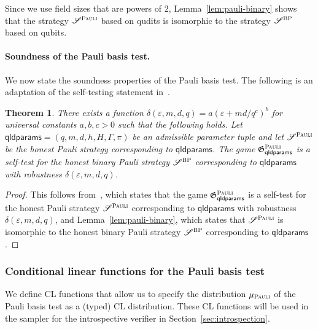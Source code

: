 \documentclass[11pt]{article}
\newtheorem{theorem}{Theorem}[section]
\theoremstyle{definition}
\newcommand{\eps}{\varepsilon}
\newcommand{\game}{\mathfrak{G}}
\newcommand{\strategy}{\mathscr{S}}
\newcommand{\gamestyle}[1]{\ensuremath{\textsc{#1}}\xspace}
\newcommand{\pauli}{\gamestyle{Pauli}}
\newcommand{\bp}{\gamestyle{BP}}
\newcommand{\qldparams}{\mathsf{qldparams}}
\begin{document}
Since we use field sizes that are powers of $2$, Lemma~\ref{lem:pauli-binary}
shows that the strategy $\strategy^\pauli$ based on qudits is isomorphic
to the strategy $\strategy^\bp$ based on qubits.


\paragraph{Soundness of the Pauli basis test.} 
We now state the soundness properties of the Pauli basis test.
The following is an adaptation of the self-testing statement in~\cite[Theorem
6.4]{NW19}.

\begin{theorem}
  \label{thm:pauli}
	There exists a function $\delta(\eps,m,d,q) = a (\eps + md/q^c)^{b}$ for
  universal constants $a,b,c > 0$ such that the following holds.
  Let $\qldparams = (q,m,d,h,H,\Gamma,\pi)$ be an admissible parameter tuple and
  let $\strategy^\pauli$ be the honest Pauli strategy corresponding to
  $\qldparams$.
  The game $\game^\pauli_\qldparams$ is a self-test for the honest binary Pauli
  strategy $\strategy^\bp$ corresponding to $\qldparams$ with robustness
  $\delta(\eps,m,d,q)$.
\end{theorem}

\begin{proof}
	This follows from~\cite[Theorem 6.4]{NW19}, which states that the game
  $\game^\pauli_\qldparams$ is a self-test for the honest Pauli strategy
  $\strategy^\pauli$ corresponding to $\qldparams$ with robustness
  $\delta(\eps,m,d,q)$, and Lemma~\ref{lem:pauli-binary}, which states that
  $\strategy^\pauli$ is isomorphic to the honest {binary} Pauli strategy
  $\strategy^\bp$ corresponding to $\qldparams$.
\end{proof}

\subsubsection{Conditional linear functions for the Pauli basis test}
\label{sec:qld-cl-funcs}

We define CL functions that allow us to specify the distribution $\mu_\pauli$ of
the Pauli basis test as a (typed) CL distribution.
These CL functions will be used in the sampler for the introspective verifier in
Section~\ref{sec:introspection}.
\end{document}

